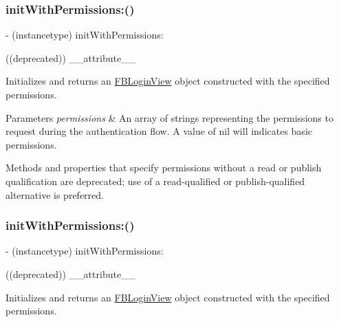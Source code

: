 \subsubsection{\texorpdfstring{init\+With\+Permissions\+:()}{initWithPermissions:()}\hspace{0.1cm}{\footnotesize\ttfamily [2/5]}}
{\footnotesize\ttfamily -\/ (instancetype) init\+With\+Permissions\+: \begin{DoxyParamCaption}\item[{((deprecated))}]{\+\_\+\+\_\+attribute\+\_\+\+\_\+ }\end{DoxyParamCaption}}

Initializes and returns an {\ttfamily \hyperlink{interfaceFBLoginView}{F\+B\+Login\+View}} object constructed with the specified permissions.


\begin{DoxyParams}{Parameters}
{\em permissions} & An array of strings representing the permissions to request during the authentication flow. A value of nil will indicates basic permissions.\\
\hline
\end{DoxyParams}
Methods and properties that specify permissions without a read or publish qualification are deprecated; use of a read-\/qualified or publish-\/qualified alternative is preferred. \mbox{\label{interfaceFBLoginView_a0fb6885fd07aa64c90378c9abcfd06a4}} 
\subsubsection{\texorpdfstring{init\+With\+Permissions\+:()}{initWithPermissions:()}\hspace{0.1cm}{\footnotesize\ttfamily [3/5]}}
{\footnotesize\ttfamily -\/ (instancetype) init\+With\+Permissions\+: \begin{DoxyParamCaption}\item[{((deprecated))}]{\+\_\+\+\_\+attribute\+\_\+\+\_\+ }\end{DoxyParamCaption}}

Initializes and returns an {\ttfamily \hyperlink{interfaceFBLoginView}{F\+B\+Login\+View}} object constructed with the specified permissions.


